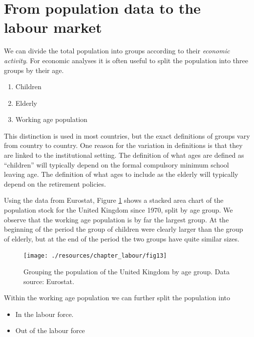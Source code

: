 \documentclass[
]{book}
\providecommand{\tightlist}{%
  \setlength{\itemsep}{0pt}\setlength{\parskip}{0pt}}
\begin{document}
\hypertarget{from-population-data-to-the-labour-market}{%
\section{From population data to the labour market}\label{from-population-data-to-the-labour-market}}

We can divide the total population into groups according to their \emph{economic activity}. For economic analyses it is often useful to split the population into three groups by their age.

\begin{enumerate}
\def\labelenumi{\arabic{enumi}.}
\tightlist
\item
  Children
\item
  Elderly
\item
  Working age population
\end{enumerate}

This distinction is used in most countries, but the exact definitions of groups vary from country to country. One reason for the variation in definitions is that they are linked to the institutional setting. The definition of what ages are defined as ``children'' will typically depend on the formal compulsory minimum school leaving age. The definition of what ages to include as the elderly will typically depend on the retirement policies.

Using the data from Eurostat, Figure \ref{fig:labour1} shows a stacked area chart of the population stock for the United Kingdom since 1970, split by age group. We observe that the working age population is by far the largest group. At the beginning of the period the group of children were clearly larger than the group of elderly, but at the end of the period the two groups have quite similar sizes.

\begin{figure}

{\centering \texttt{[image: ./resources/chapter\_labour/fig13]} 

}

\caption{Grouping the population of the United Kingdom by age group. Data source: Eurostat. }\label{fig:labour1}
\end{figure}

Within the working age population we can further split the population into

\begin{itemize}
\tightlist
\item
  In the labour force.
\item
  Out of the labour force
\end{itemize}
\end{document}
